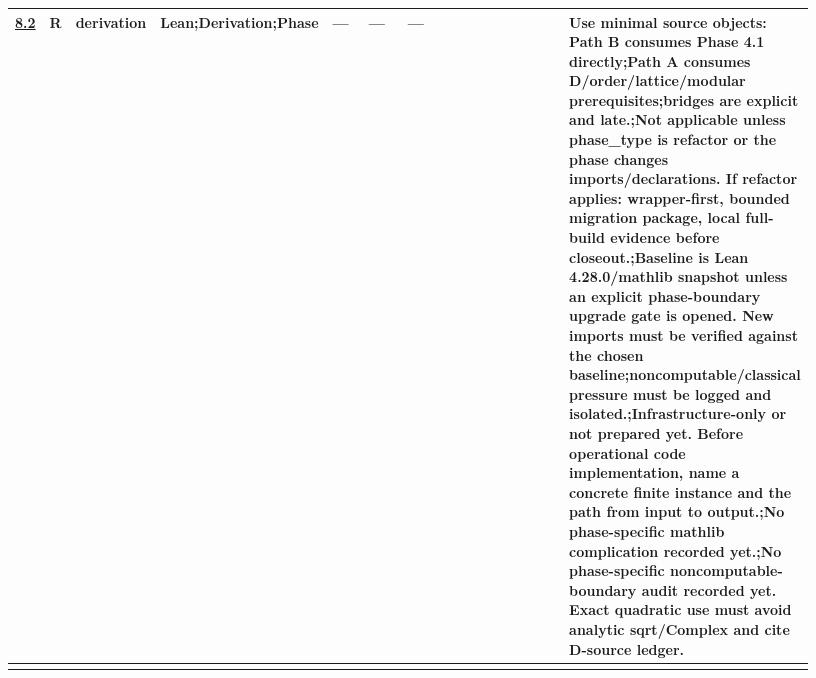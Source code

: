 \begin{longtable}{L{0.026\linewidth} L{0.024\linewidth} L{0.045\linewidth} L{0.07\linewidth} L{0.065\linewidth} L{0.075\linewidth} L{0.11\linewidth} L{0.19\linewidth} L{0.155\linewidth} L{0.17\linewidth}}
\hyperlink{phase-row-8-2}{8.2} & R & derivation & Lean;\newline Derivation;\newline Phase & --- & --- & --- &  &  & Use minimal source objects: Path B consumes Phase 4.1 directly;\newline Path A consumes D/\allowbreak{}order/\allowbreak{}lattice/\allowbreak{}modular prerequisites;\newline bridges are explicit and late.;\newline Not applicable unless phase\_type is refactor or the phase changes imports/\allowbreak{}declarations. If refactor applies: wrapper-first, bounded migration package, local full-build evidence before closeout.;\newline Baseline is Lean 4.28.0/\allowbreak{}mathlib snapshot unless an explicit phase-boundary upgrade gate is opened. New imports must be verified against the chosen baseline;\newline noncomputable/\allowbreak{}classical pressure must be logged and isolated.;\newline Infrastructure-only or not prepared yet. Before operational code implementation, name a concrete finite instance and the path from input to output.;\newline No phase-specific mathlib complication recorded yet.;\newline No phase-specific noncomputable-boundary audit recorded yet. Exact quadratic use must avoid analytic sqrt/\allowbreak{}Complex and cite D-source ledger.\\
\hline
\addlinespace[0.24em]

\end{longtable}
